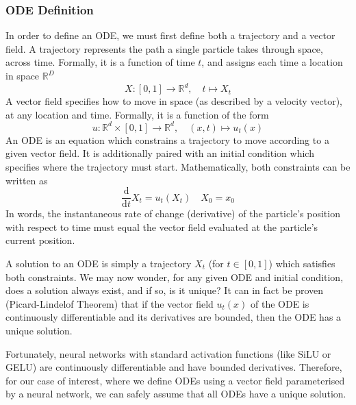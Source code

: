 \documentclass[12pt,a4paper]{report}
\begin{document}
\subsubsection{ODE Definition} In order to define an ODE, we must first define both a trajectory and a vector field. 
A trajectory represents the path a single particle takes through space, across time. %
Formally, it is a function of time $t$, and assigns each time a location in space $\mathbb{R}^D$
$$X : [0, 1] \to \mathbb{R}^d, \quad t \mapsto X_t$$ %
A vector field specifies how to move in space (as described by a velocity vector), at any location and time. %
Formally, it is a function of the form 
$$u : \mathbb{R}^d \times [0, 1] \to \mathbb{R}^d, \quad (x, t) \mapsto u_t(x)$$ %
An ODE is an equation which constrains a trajectory to move according to a given vector field. It is additionally paired with an initial condition which specifies where the trajectory must start. %
Mathematically, both constraints can be written as 
$$\frac{\mathrm{d}}{\mathrm{d}t} X_t = u_t(X_t) \quad X_0 = x_0$$ %
In words, the instantaneous rate of change (derivative) of the particle's position with respect to time must equal the vector field evaluated at the particle's current position. 

A solution to an ODE is simply a trajectory $X_t$ (for $t\in[0,1]$) which satisfies both constraints. We may now wonder, for any given ODE and initial condition, does a solution always exist, and if so, is it unique? It can in fact be proven (Picard-Lindelof Theorem) that if the vector field $u_t(x)$ of the ODE is continuously differentiable and its derivatives are bounded, then the ODE has a unique solution. 

Fortunately, neural networks with standard activation functions (like SiLU or GELU) are continuously differentiable and have bounded derivatives. Therefore, for our case of interest, where we define ODEs using a vector field parameterised by a neural network, we can safely assume that all ODEs have a unique solution. 
\end{document}
